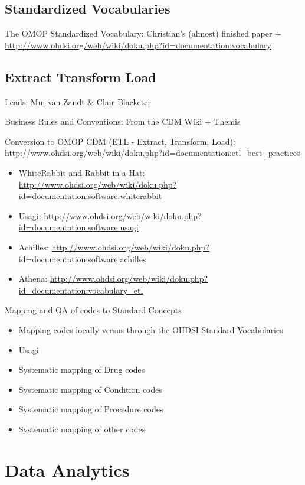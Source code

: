 \documentclass[11pt]{book}
\providecommand{\tightlist}{%
  \setlength{\itemsep}{0pt}\setlength{\parskip}{0pt}}
\begin{document}
\chapter{Standardized Vocabularies}\label{StandardizedVocabularies}

The OMOP Standardized Vocabulary: Christian's (almost) finished paper +
\url{http://www.ohdsi.org/web/wiki/doku.php?id=documentation:vocabulary}

\chapter{Extract Transform Load}\label{ExtractTransformLoad}

Leads: Mui van Zandt \& Clair Blacketer

Business Rules and Conventions: From the CDM Wiki + Themis

Conversion to OMOP CDM (ETL - Extract, Transform, Load):
\url{http://www.ohdsi.org/web/wiki/doku.php?id=documentation:etl_best_practices}

\begin{itemize}
\tightlist
\item
  WhiteRabbit and Rabbit-in-a-Hat:
  \url{http://www.ohdsi.org/web/wiki/doku.php?id=documentation:software:whiterabbit}
\item
  Usagi:
  \url{http://www.ohdsi.org/web/wiki/doku.php?id=documentation:software:usagi}
\item
  Achilles:
  \url{http://www.ohdsi.org/web/wiki/doku.php?id=documentation:software:achilles}
\item
  Athena:
  \url{http://www.ohdsi.org/web/wiki/doku.php?id=documentation:vocabulary_etl}
\end{itemize}

Mapping and QA of codes to Standard Concepts

\begin{itemize}
\tightlist
\item
  Mapping codes locally versus through the OHDSI Standard Vocabularies
\item
  Usagi
\item
  Systematic mapping of Drug codes
\item
  Systematic mapping of Condition codes
\item
  Systematic mapping of Procedure codes
\item
  Systematic mapping of other codes
\end{itemize}

\part{Data Analytics}\label{part-data-analytics}
\end{document}

